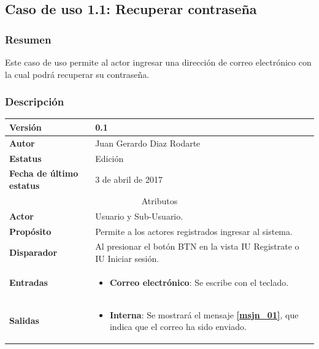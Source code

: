 \subsection{Caso de uso 1.1: Recuperar contraseña} \label{cu1_1}
\subsubsection{Resumen}
Este caso de uso permite al actor ingresar una dirección de correo electrónico con la cual podrá recuperar su contraseña.
\subsubsection{Descripción}
\begingroup
\setlength{\LTleft}{-10cm plus -1fill}
\setlength{\LTright}{\LTleft}
\begin{center}
    \addtocounter{table}{-1}
     \label{tab:cu1_1_tab}
	\begin{longtable}{| p{3.5cm} | p{11.5cm} |}
      	\hline
      		\textbf{Versión} &  0.1 \\
        \hline 
       		\textbf{Autor} & Juan Gerardo Diaz Rodarte\\
        \hline
          \textbf{Estatus} & Edición \\
        \hline  
          \textbf{Fecha de último estatus} &  3 de abril de 2017 \\
        \hline
      \multicolumn{2}{|c|}{\large{Atributos}} \\
        \hline
          \textbf{Actor} & Usuario y Sub-Usuario. \\
        \hline	
          \textbf{Propósito} & Permite a los actores registrados ingresar al sistema. \\
        \hline
          \textbf{Disparador} & Al presionar el botón BTN en la vista IU Registrate o IU Iniciar sesión. \\
        \hline	
          \textbf{Entradas} & 
            \begin{itemize}
              \item \textbf{Correo electrónico}: Se escribe con el teclado.
            \end{itemize} \\
        \hline	
          \textbf{Salidas} & 
            \begin{itemize}
              \item \textbf{Interna}: Se mostrará el mensaje \textbf{\ref{msjn_01}}, que indica que el correo ha sido enviado.

\end{itemize}
\end{longtable}
\end{center}
